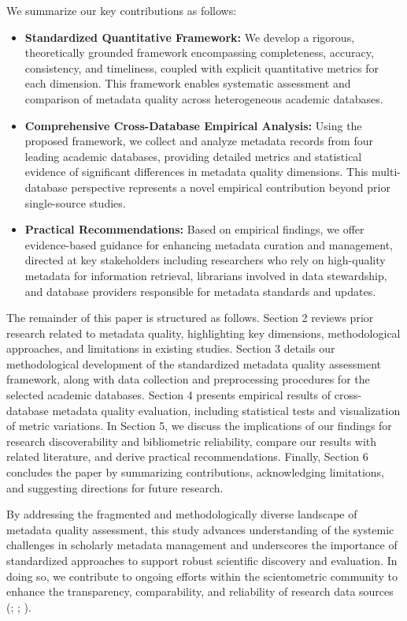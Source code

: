 \documentclass[
  12pt,
]{article}
\begin{document}
We summarize our key contributions as follows:

\begin{itemize}
\item
  \textbf{Standardized Quantitative Framework:} We develop a rigorous,
  theoretically grounded framework encompassing completeness, accuracy,
  consistency, and timeliness, coupled with explicit quantitative
  metrics for each dimension. This framework enables systematic
  assessment and comparison of metadata quality across heterogeneous
  academic databases.
\item
  \textbf{Comprehensive Cross-Database Empirical Analysis:} Using the
  proposed framework, we collect and analyze metadata records from four
  leading academic databases, providing detailed metrics and statistical
  evidence of significant differences in metadata quality dimensions.
  This multi-database perspective represents a novel empirical
  contribution beyond prior single-source studies.
\item
  \textbf{Practical Recommendations:} Based on empirical findings, we
  offer evidence-based guidance for enhancing metadata curation and
  management, directed at key stakeholders including researchers who
  rely on high-quality metadata for information retrieval, librarians
  involved in data stewardship, and database providers responsible for
  metadata standards and updates.
\end{itemize}

The remainder of this paper is structured as follows. Section 2 reviews
prior research related to metadata quality, highlighting key dimensions,
methodological approaches, and limitations in existing studies. Section
3 details our methodological development of the standardized metadata
quality assessment framework, along with data collection and
preprocessing procedures for the selected academic databases. Section 4
presents empirical results of cross-database metadata quality
evaluation, including statistical tests and visualization of metric
variations. In Section 5, we discuss the implications of our findings
for research discoverability and bibliometric reliability, compare our
results with related literature, and derive practical recommendations.
Finally, Section 6 concludes the paper by summarizing contributions,
acknowledging limitations, and suggesting directions for future
research.

By addressing the fragmented and methodologically diverse landscape of
metadata quality assessment, this study advances understanding of the
systemic challenges in scholarly metadata management and underscores the
importance of standardized approaches to support robust scientific
discovery and evaluation. In doing so, we contribute to ongoing efforts
within the scientometric community to enhance the transparency,
comparability, and reliability of research data sources
(; ; ).
\end{document}
